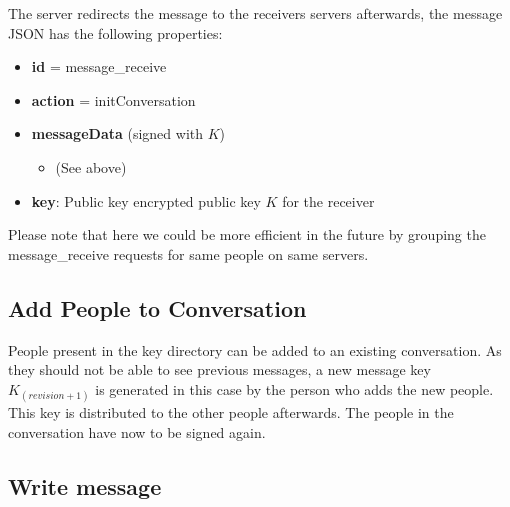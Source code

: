 \documentclass{scrartcl}
\begin{document}
The server redirects the message to the receivers servers afterwards, the message JSON has the following properties:

\begin{itemize}
    \item \textbf{id} = message\_receive
    \item \textbf{action} = initConversation
    \item \textbf{messageData} (signed with $K$)
    \begin{itemize}
    \item (See above)

    \end{itemize}
    \item \textbf{key}: Public key encrypted public key $K$ for the receiver
\end{itemize}

Please note that here we could be more efficient in the future by grouping the message\_receive requests for same people on same servers.


%            
            
            
            
\subsection{Add People to Conversation}
People present in the key directory can be added to an existing conversation.
As they should not be able to see previous messages, a new message key $K_{(revision+1)}$ is generated in this case by the person who adds the new people.
This key is distributed to the other people afterwards. The people in the conversation have now to be signed again.

\subsection{Write message}
\end{document}
